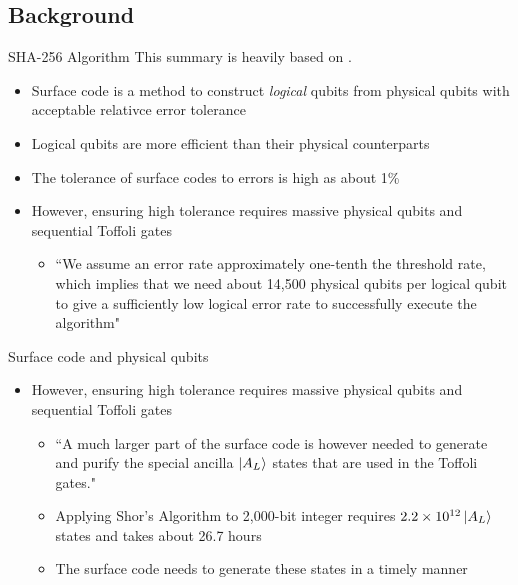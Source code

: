 \documentclass{beamer}
\begin{document}
    \subsection{Background}
    \begin{frame}{SHA-256 Algorithm}
        This summary is heavily based on \cite{Fowler_2012}.
        \begin{itemize}
            \item Surface code is a method to construct \textit{logical} qubits from physical qubits with acceptable relativce error tolerance \cite{calderbank1997quantum}
            \item Logical qubits are more efficient than their physical counterparts
            \item The tolerance of surface codes to errors is high as about 1\%
            \item However, ensuring high tolerance requires massive physical qubits and sequential Toffoli gates
            \begin{itemize}
                \item ``We assume an error rate approximately one-tenth the threshold rate, which implies that we need about 14,500 physical qubits per logical qubit to give a sufficiently low logical error rate to successfully execute the algorithm"
            \end{itemize}
        \end{itemize}
    \end{frame}
    
    \begin{frame}[t]{Surface code and physical qubits}
        \begin{itemize}
            \item However, ensuring high tolerance requires massive physical qubits and sequential Toffoli gates
            \begin{itemize}
                \item ``A much larger part of the surface code is however needed to generate and purify the special ancilla $\ket{A_L}$ states that are used in the Toffoli gates."
                \item Applying Shor's Algorithm to 2,000-bit integer requires $ 2.2 \times 10^{12} \ket{A_L}$ states and takes about 26.7 hours
                \item The surface code needs to generate these states in a timely manner
            \end{itemize}
        \end{itemize}
    \end{frame}
    
\end{document}
